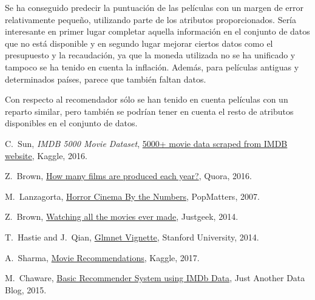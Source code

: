 \documentclass{article}
\begin{document}
Se ha conseguido predecir la puntuación de las películas con un margen de error relativamente pequeño, utilizando parte de los atributos proporcionados. Sería interesante en primer lugar completar aquella información en el conjunto de datos que no está disponible y en segundo lugar mejorar ciertos datos como el presupuesto y la recaudación, ya que la moneda utilizada no se ha unificado y tampoco se ha tenido en cuenta la inflación. Además, para películas antiguas y determinados países, parece que también faltan datos.

Con respecto al recomendador sólo se han tenido en cuenta películas con un reparto similar, pero también se podrían tener en cuenta el resto de atributos disponibles en el conjunto de datos. 

\clearpage

\begin{thebibliography}{1}


C.~Sun, \emph{IMDB 5000 Movie Dataset}, \href{https://www.kaggle.com/deepmatrix/imdb-5000-movie-dataset}{5000+ movie data scraped from IMDB website}, \relax Kaggle, 2016.

Z.~Brown, \href{https://www.quora.com/How-many-films-are-produced-each-year}{How many films are produced each year?}, \relax Quora, 2016.

M.~Lanzagorta, \href{http://www.popmatters.com/column/horror-cinema-by-the-numbers/}{Horror Cinema By the Numbers}, \relax PopMatters, 2007.

Z.~Brown, \href{http://www.justgeek.de/watching-all-the-movies-ever-made/}{Watching all the movies ever made}, \relax Justgeek, 2014.

T.~Hastie and J.~Qian, \href{https://web.stanford.edu/~hastie/glmnet/glmnet_alpha.html}{Glmnet Vignette}, \relax Stanford University, 2014.

A.~Sharma, \href{https://www.kaggle.com/arjoonn/movie-recommendations}{Movie Recommendations}, \relax Kaggle, 2017.

M.~Chaware, \href{http://justanotherdataenthusiast.blogspot.co.uk/2015/12/basic-recommender-system-using-imdb-data.html}{Basic Recommender System using IMDb Data}, \relax Just Another Data Blog, 2015.

\end{thebibliography}
\end{document}
